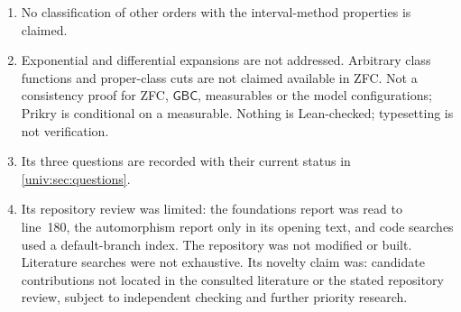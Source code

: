 \documentclass[11pt,letterpaper]{article}
\numberwithin{equation}{section}
\theoremstyle{definition}
\theoremstyle{remark}
\newcommand{\GBC}{\mathsf{GBC}}
\begin{document}
\begin{enumerate}[label=01.\arabic*,leftmargin=3.2em]
assumption.
\item No classification of other orders with the interval-method properties is
claimed.
\item Exponential and differential expansions are not addressed. Arbitrary class
functions and proper-class cuts are not claimed available in ZFC. Not a
consistency proof for ZFC, $\GBC$, measurables or the model configurations;
Prikry is conditional on a measurable. Nothing is Lean-checked; typesetting is
not verification.
\item Its three questions are recorded with their current status in
\cref{univ:sec:questions}.
\item Its repository review was limited: the foundations report was read to
line~180, the automorphism report only in its opening text, and code searches
used a default-branch index. The repository was not modified or built.
Literature searches were not exhaustive. Its novelty claim was: candidate
contributions not located in the consulted literature or the stated repository
review, subject to independent checking and further priority research.
\end{enumerate}
\end{document}

